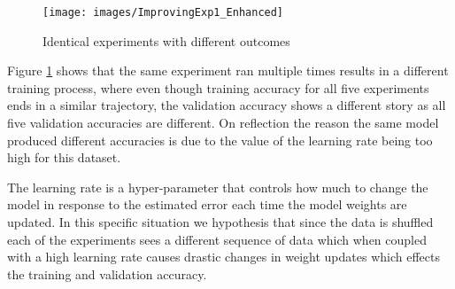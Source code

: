 \begin{figure}[H]
	\centering
	\texttt{[image: images/ImprovingExp1\_Enhanced]}
	\caption{Identical experiments with different outcomes }
	\label{fig:exp1.1_4models}
\end{figure}


Figure \ref{fig:exp1.1_4models} shows that the same experiment ran multiple times results in a different training process, where even though training accuracy for all five experiments ends in a similar trajectory, the validation accuracy shows a different story as all five validation accuracies are different. On reflection the reason the same model produced different accuracies is due to the value of the learning rate being too high for this dataset. 


The learning rate is a hyper-parameter that controls how much to change the model in response to the estimated error each time the model weights are updated. In this specific situation we hypothesis that since the data is shuffled each of the experiments sees a different sequence of data which when coupled with a high learning rate causes drastic changes in weight updates which effects the training and validation accuracy.















